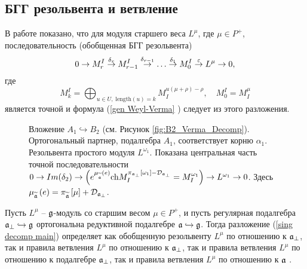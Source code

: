 \subsection{БГГ резольвента и ветвление}
В работе \cite{lepowsky1977generalization} показано, что для модуля старшего веса $L^{\mu }$, где $\mu \in P^{+}$, последовательность (обобщенная БГГ резольвента)
\begin{equation}
0\rightarrow M_{r}^{I}\overset{\delta _{r}}{\rightarrow }M_{r-1}^{I}\overset{%
\delta _{r-1}}{\rightarrow }\ldots \overset{\delta _{1}}{\rightarrow }%
M_{0}^{I}\overset{\varepsilon }{\rightarrow }L^{\mu }\rightarrow 0,
\label{resolution sequence}
\end{equation}
где
\begin{equation}
M_{k}^{I}=\bigoplus_{u\in U,\;\mathrm{length}\left( u\right)
=k}M_{I}^{u\left( \mu +\rho \right) -\rho },\quad M_{0}^{I}=M_{I}^{\mu }
\label{Verma elements sequence}
\end{equation}
является точной и формула (\ref{gen Weyl-Verma}%
) следует из этого разложения.

\begin{figure}[h!bt]
 \noindent{}
 \caption{Вложение $A_1\hookrightarrow B_2$ (см. Рисунок \ref{fig:B2_Verma_Decomp}). Ортогональный партнер, подалгебра $A_1$, соответствует корню $\alpha_1$.
   Резольвента простого модуля $L^{\omega_1}$. Показана центральная часть точной последовательности
   $0 \to Im(\delta_2) \to \left( e^{\mu _{\widetilde{%
\frak{a}}}\left( e\right) }\mathrm{ch}M_{I}^{\pi _{\afb}\left[ \omega_1 \right] -%
\mathcal{D}_{\afb} }=M^{\omega_1}_{I}\right) \to
   L^{\omega_1}\to 0 $.  Здесь $\mu _{\widetilde{\frak{a}}}\left( e\right) =\pi _{\widetilde{\mathfrak{a}}}\left[ \mu \right] + \mathcal{D}_{\mathfrak{a}_{\bot}}$.
   }
\end{figure}


\begin{statement}
Пусть $L^{\mu }$ --  $\frak{g}$-модуль со старшим весом $\mu \in P^{+}$, и пусть регулярная подалгебра  $\mathfrak{a}_{\bot}\hookrightarrow \frak{g}$ ортогональна редуктивной подалгебре $\frak{a}\hookrightarrow \frak{g}$. Тогда разложение (\ref{sing decomp main}) определяет как обобщенную резольвенту $L^{\mu }$ по отношению к $\mathfrak{a}_{\bot}$, так и правила ветвления $L^{\mu }$ по отношению к $\frak{a}_{\perp }$, так и правила ветвления $L^{\mu }$ по отношению к подалгебре $\frak{a}_{\perp }$, так и правила ветвления $L^{\mu }$ по отношению к $\frak{a}$ .
\end{statement}

